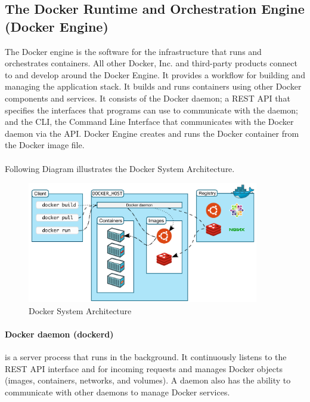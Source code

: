 		\subsection{The Docker Runtime and Orchestration Engine (Docker Engine)} 
		\label{Grundlagen:Docker:Docker Engine}
		The Docker engine is the software for the infrastructure that runs and orchestrates containers. All other Docker, Inc. and third-party products connect to and develop around the Docker Engine. It provides a workflow for building and managing the application stack. It builds and runs containers using other Docker components and services. It consists of the Docker daemon; a REST API that specifies the interfaces that programs can use to communicate with the daemon; and the CLI, the Command Line Interface that communicates with the Docker daemon via the API. Docker Engine creates and runs the Docker container from the Docker image file.\\
		\\
		Following Diagram illustrates the Docker System Architecture.
		\begin{figure}[H]
			\centering
			\includegraphics[width=0.9\textwidth]{"Bilder/DockerArchitecture.png"}
			\caption{Docker System Architecture \cite{dockerOverwiew}}
			\label{fig:Background:DockerEngine:Architecture}					
		\end{figure}

		\paragraph{Docker daemon (dockerd)}  is a server process that runs
		in the background. It continuously listens to the REST API interface
		and for incoming requests and manages Docker objects (images, containers, networks, and volumes).  A daemon also has the ability to communicate with other daemons to manage Docker services.\cite{dockerOverwiew}

